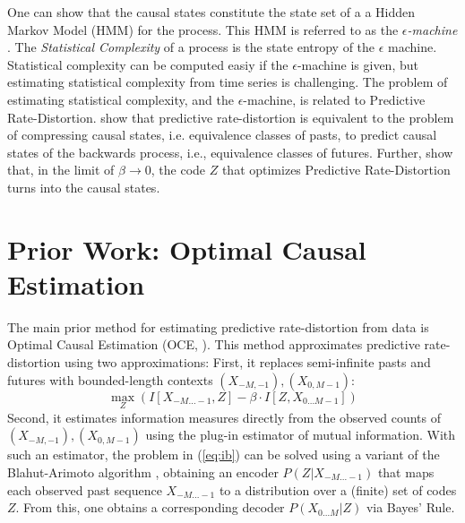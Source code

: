 \documentclass[11pt,letterpaper]{article}
\begin{document}
One can show that the causal states constitute the state set of a a Hidden Markov Model (HMM) for the process.
This HMM is referred to as the \emph{$\epsilon$-machine}  \citep{crutchfield-inferring-1989}.
The \emph{Statistical Complexity} of a process is the state entropy of the $\epsilon$ machine.
Statistical complexity can be computed easiy if the $\epsilon$-machine is given, but estimating statistical complexity from time series is challenging.
The problem of estimating statistical complexity, and the $\epsilon$-machine, is related to Predictive Rate-Distortion.
\citep{marzen-predictive-2016} show that predictive rate-distortion is equivalent to the problem of compressing causal states, i.e. equivalence classes of pasts, to predict causal states of the backwards process, i.e., equivalence classes of futures.
Further, \cite{still-optimal-2010} show that, in the limit of $\beta \rightarrow 0$, the code $Z$ that optimizes Predictive Rate-Distortion turns into the causal states.




\section{Prior Work: Optimal Causal Estimation}

The main prior method for estimating predictive rate-distortion from data is Optimal Causal Estimation (OCE, \citet{still-optimal-2010}).
This method approximates predictive rate-distortion using two approximations:
First, it replaces semi-infinite pasts and futures with bounded-length contexts $(X_{-M, -1}), (X_{0, M-1})$:
\begin{equation}\label{eq:ib-oce}
	\max_{Z} \left( I[X_{-M\dots -1}, Z] - \beta \cdot I[Z, X_{0\dots M-1}] \right)
\end{equation}
Second, it estimates information measures directly from the observed counts of $(X_{-M, -1}), (X_{0, M-1})$ using the plug-in estimator of mutual information.
With such an estimator, the problem in (\ref{eq:ib}) can be solved using a variant of the Blahut-Arimoto algorithm \citep{tishby-information-1999}, obtaining an encoder $P(Z|X_{-M...-1})$ that maps each observed past sequence $X_{-M...-1}$ to a distribution over a (finite) set of codes $Z$. From this, one obtains a corresponding decoder $P(X_{0...M}|Z)$ via Bayes' Rule.
\end{document}
